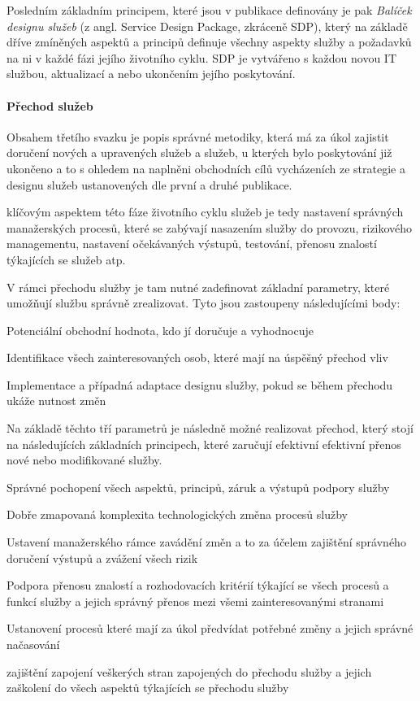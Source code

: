 \documentclass[
  digital,     %
  twoside,     %
  lof,         %
  lot,         %
]{fithesis4}
\begin{document}
Posledním základním principem, které jsou v publikace definovány je pak \emph{Balíček designu služeb} (z angl. Service Design Package, zkráceně SDP), který na základě dříve zmíněných aspektů a principů definuje všechny aspekty služby a požadavků na ni v každé fázi jejího životního cyklu. SDP je vytvářeno s každou novou IT službou, aktualizací a nebo ukončením jejího poskytování.\parencite[s.~23]{Carlidge2007}
\paragraph{Přechod služeb}
Obsahem třetího svazku je popis správné metodiky, která má za úkol zajistit doručení nových a upravených služeb a služeb, u kterých bylo poskytování již ukončeno a to s ohledem na naplněni obchodních cílů vycházeních ze strategie a designu služeb ustanovených dle první a druhé publikace.\parencite[s.~30]{Carlidge2007}

klíčovým aspektem této fáze životního cyklu služeb je tedy nastavení správných manažerských procesů, které se zabývají nasazením služby do provozu, rizikového managementu, nastavení očekávaných výstupů, testování, přenosu znalostí týkajících se služeb atp.\parencite[s.~30]{Carlidge2007}

V rámci přechodu služby je tam nutné zadefinovat základní parametry, které umožňují službu správně zrealizovat. Tyto jsou zastoupeny následujícími body:\parencite[s.~30]{Carlidge2007}
\begin{compactitem}
    \item Potenciální obchodní hodnota, kdo jí doručuje a vyhodnocuje
    \item Identifikace všech zainteresovaných osob, které mají na úspěšný přechod vliv
    \item Implementace a případná adaptace designu služby, pokud se během přechodu ukáže nutnost změn
\end{compactitem}

Na základě těchto tří parametrů je následně možné realizovat přechod, který stojí na následujících základních principech, které zaručují efektivní efektivní přenos nové nebo modifikované služby. \parencite[s.~30]{Carlidge2007}
\begin{compactitem}
    \item Správné pochopení všech aspektů, principů, záruk a výstupů podpory služby
    \item Dobře zmapovaná komplexita technologických změna  procesů služby
    \item Ustavení manažerského rámce zavádění změn a to za účelem zajištění správného doručení výstupů a zvážení všech rizik
    \item Podpora přenosu znalostí a rozhodovacích kritérií týkající se všech procesů a funkcí služby a jejich správný přenos mezi všemi zainteresovanými stranami
    \item Ustanovení procesů které mají za úkol předvídat potřebné změny a jejich správné načasování
    \item zajištění zapojení veškerých stran zapojených do přechodu služby a jejich zaškolení do všech aspektů týkajících se přechodu služby
\end{compactitem}
\end{document}
